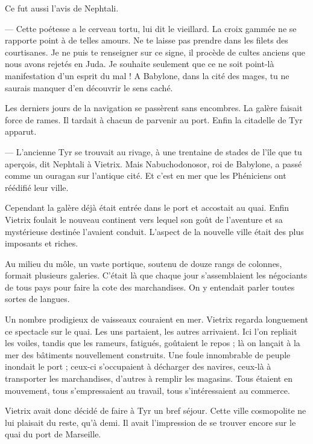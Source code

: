 \documentclass[a4paper, 11pt, oneside, polutonikogreek, french]{article}
\begin{document}
Ce fut aussi l'avis de Nephtali.

--- Cette poétesse a le cerveau tortu, lui dit le vieillard. La croix gammée ne se rapporte point à de telles amours. Ne te laisse pas prendre dans les filets des courtisanes. Je ne puis te renseigner sur ce signe, il procède de cultes anciens que nous avons rejetés en Juda. Je souhaite seulement que ce ne soit point-là manifestation d'un esprit du mal ! A Babylone, dans la cité des mages, tu ne saurais manquer d'en découvrir le sens caché.

\bigskip
\centerline{\EightStarTaper}
\centerline{\EightStarTaper\EightStarTaper}
\bigskip

Les derniers jours de la navigation se passèrent sans encombres. La galère faisait force de rames. Il tardait à chacun de parvenir au port. Enfin la citadelle de Tyr apparut.

--- L'ancienne Tyr se trouvait au rivage, à une trentaine de stades de l'île que tu aperçois, dit Nephtali à Vietrix. Mais Nabuchodonosor, roi de Babylone, a passé comme un ouragan sur l'antique cité. Et c'est en mer que les Phéniciens ont réédifié leur ville.

Cependant la galère déjà était entrée dans le port et accostait au quai. Enfin Vietrix foulait le nouveau continent vers lequel son goût de l'aventure et sa mystérieuse destinée l'avaient conduit. L'aspect de la nouvelle ville était des plus imposants et riches.

Au milieu du môle, un vaste portique, soutenu de douze rangs de colonnes, formait plusieurs galeries. C'était là que chaque jour s'assemblaient les négociants de tous pays pour faire la cote des marchandises. On y entendait parler toutes sortes de langues.

Un nombre prodigieux de vaisseaux couraient en mer. Vietrix regarda longuement ce spectacle sur le quai. Les uns partaient, les autres arrivaient. Ici l'on repliait les voiles, tandis que les rameurs, fatigués, goûtaient le repos ; là on lançait à la mer des bâtiments nouvellement construits. Une foule innombrable de peuple inondait le port ; ceux-ci s'occupaient à décharger des navires, ceux-là à transporter les marchandises, d'autres à remplir les magasins. Tous étaient en mouvement, tous s'empressaient au travail, tous s'intéressaient au commerce.

\bigskip
\centerline{\EightStarTaper}
\centerline{\EightStarTaper\EightStarTaper}
\bigskip

Vietrix avait donc décidé de faire à Tyr un bref séjour. Cette ville cosmopolite ne lui plaisait du reste, qu'à demi. Il avait l'impression de se trouver encore sur le quai du port de Marseille.
\end{document}
